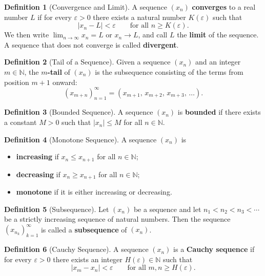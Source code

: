 \documentclass[12pt,a4paper]{article}
\theoremstyle{definition}
\newtheorem*{definition}{Definition}
\newcommand{\N}{\mathbb{N}}
\newcommand{\eps}{\varepsilon}
\newcommand{\abs}[1]{\left\lvert#1\right\rvert}
\begin{document}
\begin{definition}[Convergence and Limit]
A sequence \((x_n)\) \textbf{converges} to a real number \(L\) if for every \(\eps>0\) there exists a natural number \(K(\eps)\) such that
\[
\abs{x_n - L} < \eps \qquad\text{for all } n\ge K(\eps).
\]
We then write \(\lim_{n\to\infty} x_n = L\) or \(x_n\to L\), and call \(L\) the \textbf{limit} of the sequence. A sequence that does not converge is called \textbf{divergent}.
\end{definition}

\begin{definition}[Tail of a Sequence]
Given a sequence \((x_n)\) and an integer \(m\in\N\), the \textbf{\(m\)-tail} of \((x_n)\) is the subsequence consisting of the terms from position \(m+1\) onward:
\[
(x_{m+n})_{n=1}^\infty = (x_{m+1},\, x_{m+2},\, x_{m+3},\,\dots).
\]
\end{definition}

\begin{definition}[Bounded Sequence]
A sequence \((x_n)\) is \textbf{bounded} if there exists a constant \(M>0\) such that \(\abs{x_n}\le M\) for all \(n\in\N\).
\end{definition}

\begin{definition}[Monotone Sequence]
A sequence \((x_n)\) is
\begin{itemize}
    \item \textbf{increasing} if \(x_n\le x_{n+1}\) for all \(n\in\N\);
    \item \textbf{decreasing} if \(x_n\ge x_{n+1}\) for all \(n\in\N\);
    \item \textbf{monotone} if it is either increasing or decreasing.
\end{itemize}
\end{definition}

\begin{definition}[Subsequence]
Let \((x_n)\) be a sequence and let \(n_1<n_2<n_3<\cdots\) be a strictly increasing sequence of natural numbers. Then the sequence \((x_{n_k})_{k=1}^\infty\) is called a \textbf{subsequence} of \((x_n)\).
\end{definition}

\begin{definition}[Cauchy Sequence]
A sequence \((x_n)\) is a \textbf{Cauchy sequence} if for every \(\eps>0\) there exists an integer \(H(\eps)\in\N\) such that
\[
\abs{x_m - x_n} < \eps \qquad\text{for all } m,n\ge H(\eps).
\]
\end{definition}
\end{document}
